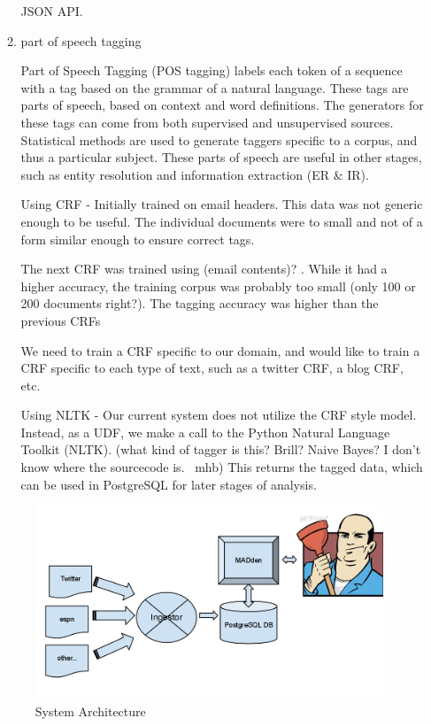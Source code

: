 \documentclass{article}
\begin{document}
\begin{enumerate}
\begin{enumerate}
    JSON API.


  \item part of speech tagging

    Part of Speech Tagging (POS tagging) labels each token of a sequence with a tag based on the grammar of a natural language.
    These tags are parts of speech, based on context and word definitions.
    The generators for these tags can come from both supervised and unsupervised sources.
    Statistical methods are used to generate taggers specific to a corpus, and thus a particular subject.
    These parts of speech are useful in other stages, such as entity resolution and information extraction (ER \& IR).

    Using CRF -
    Initially trained on email headers.
    This data was not generic enough to be useful.
    The individual documents were to small and not of a form similar enough to ensure correct tags.

    The next CRF was trained using (email contents)? .
    While it had a higher accuracy, the training corpus was probably too small (only 100 or 200 documents right?).
    The tagging accuracy was higher than the previous CRFs

    We need to train a CRF specific to our domain,
    and would like to train a CRF specific to each type of text,
    such as a twitter CRF, a blog CRF, etc.

    Using NLTK -
    Our current system does not utilize the CRF style model.
    Instead, as a UDF, we make a call to the Python Natural Language Toolkit (NLTK).
    (what kind of tagger is this? Brill? Naive Bayes? I don't know where the sourcecode is. ~mhb)
    This returns the tagged data, which can be used in PostgreSQL for later stages of analysis.


  \end{enumerate}





  \begin{figure}
    \begin{center}
      \includegraphics[width=104mm]{architecture-1.png}
      \caption{System Architecture}
      \label{fig:architecture}
    \end{center}
  \end{figure}


\end{enumerate}
\end{document}
